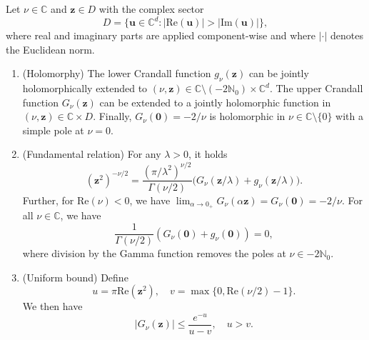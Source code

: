 \documentclass[]{amsart}
\newcommand{\new}[1]{#1}
\renewcommand{\Re}[1]{\mathrm{Re}(#1)}
\renewcommand{\Im}[1]{\mathrm{Im}(#1)}
\numberwithin{mythm}{section}
\begin{document}
\begin{lemma}
\label{lem:propCrandall}
Let $\nu \in\mathds C$ and $\bm z\in D$ with the complex sector
$$
D=\{\bm u\in\mathds C^d:|\Re{\bm u}|>|\Im{\bm u}|\},
$$
where real and imaginary parts are applied component-wise and where $\vert \bm \cdot \vert$ denotes the Euclidean norm.
\begin{enumerate}
\item (Holomorphy) The lower Crandall function $g_{\nu}(\bm z)$ 
\new{can be jointly holomorphically extended to} 
$(\nu,\bm z)\in\mathds C\setminus(-2\mathds N_0)\times \mathds C^d$. The upper Crandall function $G_{\nu}(\bm z)$ can be extended to a jointly holomorphic function in $(\nu,\bm z)\in \mathds C \times D$. Finally,
$G_{\nu}(\bm 0)=-2/\nu$ is holomorphic in $\nu\in\mathds C\setminus\{0\}$
with a simple pole at $\nu=0$.
\item (Fundamental relation)
For any $\lambda>0$, it holds
\[
( \bm z^2 )^{-\nu/2} = \frac{(\pi/\lambda^2 )^{\nu/2}}{\Gamma(\nu/2)} \Big(G_\nu(\bm z/\lambda)+g_\nu(\bm z/\lambda)\Big).
\]
Further, for $\mathrm{Re}(\nu)<0$, we have $\lim_{\alpha \to 0_+} G_\nu(\alpha\bm z)=G_\nu(\bm 0)=-2/\nu$. For all $\nu \in \mathds C$, we have
\[
\frac{1}{\Gamma(\nu/2)}(G_\nu(\bm 0)+g_\nu(\bm 0)) = 0,
\]
\new{where division by the Gamma function removes the poles at $\nu\in -2 \mathds N_0$.}
\item (Uniform bound)
Define
\[
u=\pi \mathrm{Re}(\bm z^2),\quad v=\max\{0,\mathrm{Re}(\nu/2)-1\}.\] 
We then have
$$
|G_\nu(\bm z)| \leq \frac{e^{-u}}{u-v}, \quad u>v.
$$
\end{enumerate}
\end{lemma}
\end{document}
